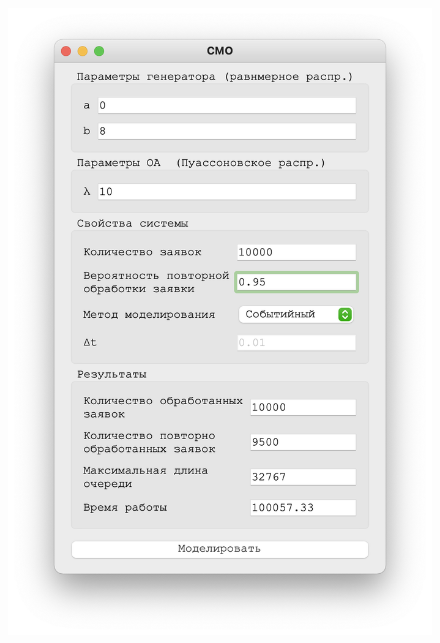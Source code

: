  \begin{figure}[!htb]
    \begin{minipage}{0.55\textwidth}
      \centering
      \includegraphics[width=1\linewidth]{10-95-s}
    \end{minipage}\hfill
    \begin{minipage}{0.55\textwidth}
      \centering

\end{minipage}
\end{figure}
